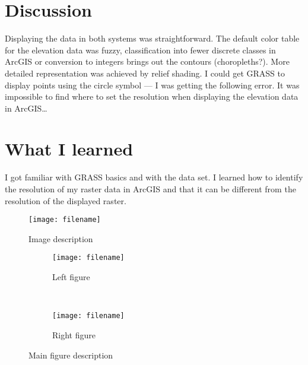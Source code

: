\documentclass[10pt]{article}
\newcommand{\oneimgwidth}{0.7\textwidth}
\newcommand{\twoimgwidth}{0.45\textwidth}
\begin{document}
\section*{Discussion}

Displaying the data in both systems was straightforward. The default color table
for the elevation data was fuzzy, classification into fewer discrete classes
in ArcGIS or conversion to integers brings out the contours (choropleths?).
More detailed representation was achieved by relief shading.
I could get GRASS to display points using the circle symbol --- I was getting the following error.
It was impossible to find where to set the resolution when displaying the elevation data in ArcGIS\ldots


\section*{What I learned}

I got familiar with GRASS basics and with the data set.
I learned how to identify the resolution of my raster data in ArcGIS
and that it can be different from the resolution of the displayed raster.

\begin{figure}[htbp]
  \centering
  \texttt{[image: filename]}
  \caption{Image description}
  \label{fig:figure-internal-label}
\end{figure}

\begin{figure}[htbp]
  \centering
  \begin{subfigure}[b]{\twoimgwidth}
    \texttt{[image: filename]}
    \caption{Left figure}
  \end{subfigure}%
  ~ %
  \begin{subfigure}[b]{\twoimgwidth}
    \texttt{[image: filename]}
    \caption{Right figure}
  \end{subfigure}
  \caption{Main figure description}
  \label{fig:twotwo}
\end{figure}
\end{document}
